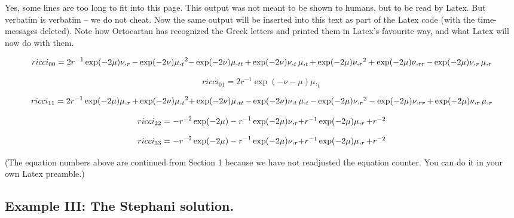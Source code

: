 \bigskip

\noindent Yes, some lines are too long to fit into this page. This output was
not meant to be shown to humans, but to be read by Latex. But verbatim is
verbatim -- we do not cheat. Now the same output will be inserted into this
text as part of the Latex code (with the time-messages deleted). Note how
Ortocartan has recognized the Greek letters and printed them in Latex's
favourite way, and what Latex will now do with them.

\begin{equation}
ricci_{00} = 2r^{-1}\exp (- 2{\mu}){\nu},_{r} - \exp (- 2{\nu}){{\mu},_{t}}^{2}
$$

$$
- \exp (- 2{\nu}){\mu},_{t t} + \exp (- 2{\nu}){\nu},_{t}{\mu},_{t} + \exp (- 2{\mu}){{\nu},_{r}}^{2} + \exp (- 2{\mu})
$$

$$
{\nu},_{r r} - \exp (- 2{\mu}){\nu},_{r}{\mu},_{r}
\end{equation}

\begin{equation}
ricci_{01} = 2r^{-1}\exp (- {\nu} - {\mu}){\mu},_{t}
\end{equation}

\begin{equation}
ricci_{11} = 2r^{-1}\exp (- 2{\mu}){\mu},_{r} + \exp (- 2{\nu}){{\mu},_{t}}^{2}
$$

$$
+ \exp (- 2{\nu}){\mu},_{t t} - \exp (- 2{\nu}){\nu},_{t}{\mu},_{t} - \exp (- 2{\mu}){{\nu},_{r}}^{2} - \exp (- 2{\mu})
$$

$$
{\nu},_{r r} + \exp (- 2{\mu}){\nu},_{r}{\mu},_{r}
\end{equation}

\begin{equation}
ricci_{22} = - r^{-2}\exp (- 2{\mu}) - r^{-1}\exp (- 2{\mu}){\nu},_{r}
$$

$$
+ r^{-1}\exp (- 2{\mu}){\mu},_{r} + r^{-2}
\end{equation}

\begin{equation}
ricci_{33} = - r^{-2}\exp (- 2{\mu}) - r^{-1}\exp (- 2{\mu}){\nu},_{r}
$$

$$
+ r^{-1}\exp (- 2{\mu}){\mu},_{r} + r^{-2}
\end{equation}

\noindent (The equation numbers above are continued from Section 1 because we
have not readjusted the equation counter. You can do it in your own Latex
preamble.)

\subsection{Example III: The Stephani solution.}

